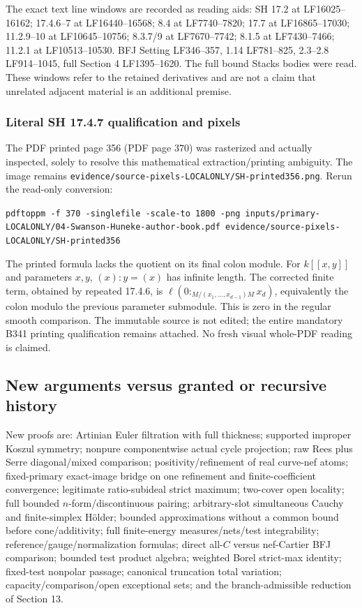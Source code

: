 \documentclass[
]{article}
\begin{document}
The exact text line windows are recorded as reading aids: SH 17.2 at
LF16025--16162; 17.4.6--7 at LF16440--16568; 8.4 at LF7740--7820; 17.7
at LF16865--17030; 11.2.9--10 at LF10645--10756; 8.3.7/9 at
LF7670--7742; 8.1.5 at LF7430--7466; 11.2.1 at LF10513--10530. BFJ
Setting LF346--357, 1.14 LF781--825, 2.3--2.8 LF914--1045, full Section
4 LF1395--1620. The full bound Stacks bodies were read. These windows
refer to the retained derivatives and are not a claim that unrelated
adjacent material is an additional premise.

\subsubsection{Literal SH 17.4.7 qualification and
pixels}\label{literal-sh-17.4.7-qualification-and-pixels}

The PDF printed page 356 (PDF page 370) was rasterized and actually
inspected, solely to resolve this mathematical extraction/printing
ambiguity. The image remains
\texttt{evidence/source-pixels-LOCALONLY/SH-printed356.png}. Rerun the
read-only conversion:

\texttt{pdftoppm\ -f\ 370\ -singlefile\ -scale-to\ 1800\ -png\ inputs/primary-LOCALONLY/04-Swanson-Huneke-author-book.pdf\ evidence/source-pixels-LOCALONLY/SH-printed356}

The printed formula lacks the quotient on its final colon module. For
\(k[[x,y]]\) and parameters \(x,y\), \((x):y=(x)\) has infinite length.
The corrected finite term, obtained by repeated 17.4.6, is
\(\ell(0:_{M/(x_1,\ldots,x_{d-1})M}x_d)\), equivalently the colon modulo
the previous parameter submodule. This is zero in the regular smooth
comparison. The immutable source is not edited; the entire mandatory
B341 printing qualification remains attached. No fresh visual whole-PDF
reading is claimed.

\subsection{New arguments versus granted or recursive
history}\label{new-arguments-versus-granted-or-recursive-history}

New proofs are: Artinian Euler filtration with full thickness; supported
improper Koszul symmetry; nonpure componentwise actual cycle projection;
raw Rees plus Serre diagonal/mixed comparison; positivity/refinement of
real curve-nef atoms; fixed-primary exact-image bridge on one refinement
and finite-coefficient convergence; legitimate ratio-subideal strict
maximum; two-cover open locality; full bounded \(n\)-form/discontinuous
pairing; arbitrary-slot simultaneous Cauchy and finite-simplex Hölder;
bounded approximations without a common bound before cone/additivity;
full finite-energy measures/nets/test integrability;
reference/gauge/normalization formulas; direct all-\(C\) versus
nef-Cartier BFJ comparison; bounded test product algebra; weighted Borel
strict-max identity; fixed-test nonpolar passage; canonical truncation
total variation; capacity/comparison/open exceptional sets; and the
branch-admissible reduction of Section 13.
\end{document}
